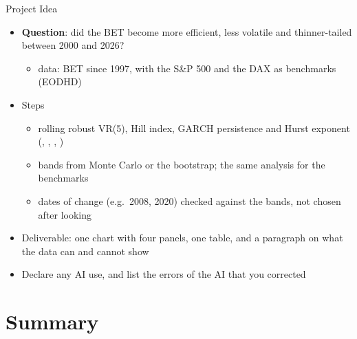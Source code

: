 \begin{frame}{Project Idea}
\itemsize{\small}
\begin{itemize}
    \item \textbf{Question}: did the BET become more efficient, less volatile and thinner-tailed between 2000 and 2026?
    \begin{itemize}
        \item data: BET since 1997, with the S\&P 500 and the DAX as benchmarks (EODHD)
    \end{itemize}
    \item Steps
    \begin{itemize}
        \item rolling robust VR(5), Hill index, GARCH persistence and Hurst exponent (, , , )
        \item bands from Monte Carlo or the bootstrap; the same analysis for the benchmarks
        \item dates of change (e.g.\ 2008, 2020) checked against the bands, not chosen after looking
    \end{itemize}
    \item Deliverable: one chart with four panels, one table, and a paragraph on what the data can and cannot show
    \item Declare any AI use, and list the errors of the AI that you corrected
\end{itemize}
\end{frame}


\section{Summary}

